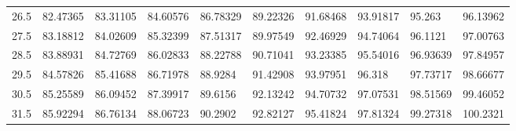 \documentclass[10pt,twocolumn,letterpaper]{article}
\begin{document}
\begin{table}
{\begin{tabular}{llllllllll}
    26.5            & 82.47365                               & 83.31105                               & 84.60576                                & 86.78329                                & 89.22326                                & 91.68468                                & 93.91817                                & 95.263                                  & 96.13962                                \\
    27.5            & 83.18812                               & 84.02609                               & 85.32399                                & 87.51317                                & 89.97549                                & 92.46929                                & 94.74064                                & 96.1121                                 & 97.00763                                \\
    28.5            & 83.88931                               & 84.72769                               & 86.02833                                & 88.22788                                & 90.71041                                & 93.23385                                & 95.54016                                & 96.93639                                & 97.84957                                \\
    29.5            & 84.57826                               & 85.41688                               & 86.71978                                & 88.9284                                 & 91.42908                                & 93.97951                                & 96.318                                  & 97.73717                                & 98.66677                                \\
    30.5            & 85.25589                               & 86.09452                               & 87.39917                                & 89.6156                                 & 92.13242                                & 94.70732                                & 97.07531                                & 98.51569                                & 99.46052                                \\
    31.5            & 85.92294                               & 86.76134                               & 88.06723                                & 90.2902                                 & 92.82127                                & 95.41824                                & 97.81324                                & 99.27318                                & 100.2321                                \\

\end{tabular}}
\end{table}
\end{document}

